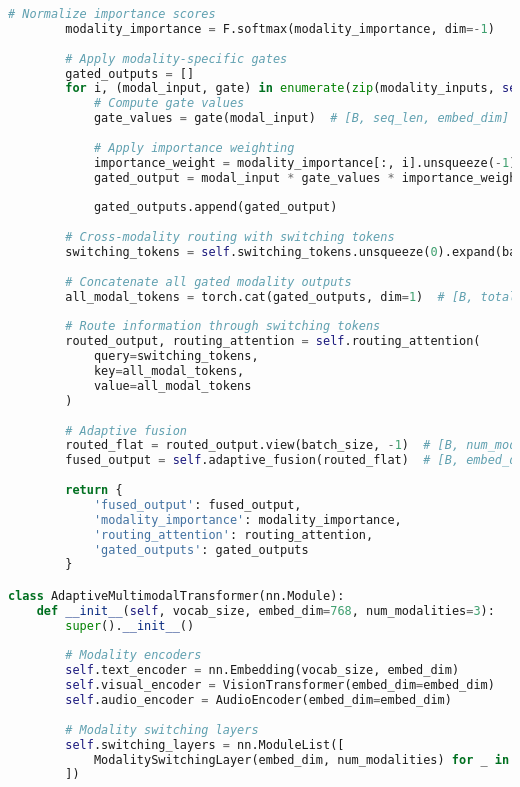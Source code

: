 \begin{lstlisting}[language=Python, caption=Dynamic modality switching architecture]
        # Normalize importance scores
        modality_importance = F.softmax(modality_importance, dim=-1)
        
        # Apply modality-specific gates
        gated_outputs = []
        for i, (modal_input, gate) in enumerate(zip(modality_inputs, self.modality_gates)):
            # Compute gate values
            gate_values = gate(modal_input)  # [B, seq_len, embed_dim]
            
            # Apply importance weighting
            importance_weight = modality_importance[:, i].unsqueeze(-1).unsqueeze(-1)
            gated_output = modal_input * gate_values * importance_weight
            
            gated_outputs.append(gated_output)
        
        # Cross-modality routing with switching tokens
        switching_tokens = self.switching_tokens.unsqueeze(0).expand(batch_size, -1, -1)
        
        # Concatenate all gated modality outputs
        all_modal_tokens = torch.cat(gated_outputs, dim=1)  # [B, total_seq_len, embed_dim]
        
        # Route information through switching tokens
        routed_output, routing_attention = self.routing_attention(
            query=switching_tokens,
            key=all_modal_tokens,
            value=all_modal_tokens
        )
        
        # Adaptive fusion
        routed_flat = routed_output.view(batch_size, -1)  # [B, num_modalities * embed_dim]
        fused_output = self.adaptive_fusion(routed_flat)  # [B, embed_dim]
        
        return {
            'fused_output': fused_output,
            'modality_importance': modality_importance,
            'routing_attention': routing_attention,
            'gated_outputs': gated_outputs
        }

class AdaptiveMultimodalTransformer(nn.Module):
    def __init__(self, vocab_size, embed_dim=768, num_modalities=3):
        super().__init__()
        
        # Modality encoders
        self.text_encoder = nn.Embedding(vocab_size, embed_dim)
        self.visual_encoder = VisionTransformer(embed_dim=embed_dim)
        self.audio_encoder = AudioEncoder(embed_dim=embed_dim)
        
        # Modality switching layers
        self.switching_layers = nn.ModuleList([
            ModalitySwitchingLayer(embed_dim, num_modalities) for _ in range(4)
        ])
        

\end{lstlisting}
